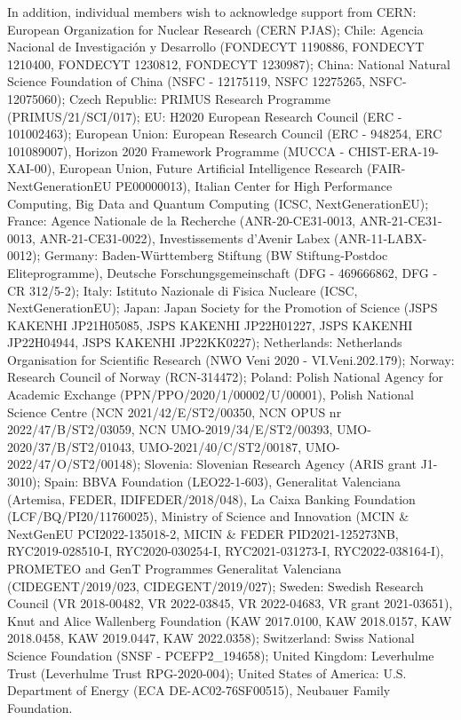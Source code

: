\documentclass[atlasdraft=false, cernpreprint, UKenglish, texmf, orcidlogo]{atlasdoc}
\begin{document}
In addition, individual members wish to acknowledge support from CERN: European Organization for Nuclear Research (CERN PJAS); Chile: Agencia Nacional de Investigaci\'on y Desarrollo (FONDECYT 1190886, FONDECYT 1210400, FONDECYT 1230812, FONDECYT 1230987); China: National Natural Science Foundation of China (NSFC - 12175119, NSFC 12275265, NSFC-12075060); Czech Republic: PRIMUS Research Programme (PRIMUS/21/SCI/017); EU: H2020 European Research Council (ERC - 101002463); European Union: European Research Council (ERC - 948254, ERC 101089007), Horizon 2020 Framework Programme (MUCCA - CHIST-ERA-19-XAI-00), European Union, Future Artificial Intelligence Research (FAIR-NextGenerationEU PE00000013), Italian Center for High Performance Computing, Big Data and Quantum Computing (ICSC, NextGenerationEU); France: Agence Nationale de la Recherche (ANR-20-CE31-0013, ANR-21-CE31-0013, ANR-21-CE31-0022), Investissements d'Avenir Labex (ANR-11-LABX-0012); Germany: Baden-Württemberg Stiftung (BW Stiftung-Postdoc Eliteprogramme), Deutsche Forschungsgemeinschaft (DFG - 469666862, DFG - CR 312/5-2); Italy: Istituto Nazionale di Fisica Nucleare (ICSC, NextGenerationEU); Japan: Japan Society for the Promotion of Science (JSPS KAKENHI JP21H05085, JSPS KAKENHI JP22H01227, JSPS KAKENHI JP22H04944, JSPS KAKENHI JP22KK0227); Netherlands: Netherlands Organisation for Scientific Research (NWO Veni 2020 - VI.Veni.202.179); Norway: Research Council of Norway (RCN-314472); Poland: Polish National Agency for Academic Exchange (PPN/PPO/2020/1/00002/U/00001), Polish National Science Centre (NCN 2021/42/E/ST2/00350, NCN OPUS nr 2022/47/B/ST2/03059, NCN UMO-2019/34/E/ST2/00393, UMO-2020/37/B/ST2/01043, UMO-2021/40/C/ST2/00187, UMO-2022/47/O/ST2/00148); Slovenia: Slovenian Research Agency (ARIS grant J1-3010); Spain: BBVA Foundation (LEO22-1-603), Generalitat Valenciana (Artemisa, FEDER, IDIFEDER/2018/048), La Caixa Banking Foundation (LCF/BQ/PI20/11760025), Ministry of Science and Innovation (MCIN \& NextGenEU PCI2022-135018-2, MICIN \& FEDER PID2021-125273NB, RYC2019-028510-I, RYC2020-030254-I, RYC2021-031273-I, RYC2022-038164-I), PROMETEO and GenT Programmes Generalitat Valenciana (CIDEGENT/2019/023, CIDEGENT/2019/027); Sweden: Swedish Research Council (VR 2018-00482, VR 2022-03845, VR 2022-04683, VR grant 2021-03651), Knut and Alice Wallenberg Foundation (KAW 2017.0100, KAW 2018.0157, KAW 2018.0458, KAW 2019.0447, KAW 2022.0358); Switzerland: Swiss National Science Foundation (SNSF - PCEFP2\_194658); United Kingdom: Leverhulme Trust (Leverhulme Trust RPG-2020-004); United States of America: U.S. Department of Energy (ECA DE-AC02-76SF00515), Neubauer Family Foundation.
 


 
 


 
 
\printbibliography
 
\clearpage

 

 
 
\end{document}
